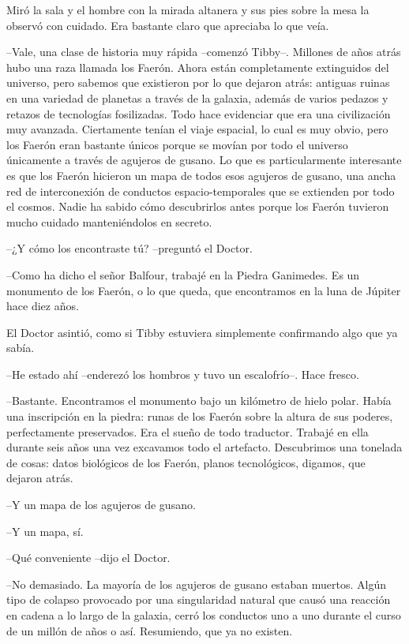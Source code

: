 {Miró la sala y el hombre con la mirada altanera y sus pies sobre la mesa
la observó con cuidado. Era bastante claro que apreciaba lo que veía.}

{--Vale, una clase de historia muy rápida --comenzó Tibby--. Millones de
 años atrás hubo una raza llamada los Faerón. Ahora están completamente
 extinguidos del universo, pero sabemos que existieron por lo que dejaron
 atrás: antiguas ruinas en una variedad de planetas a través de la
 galaxia, además de varios pedazos y retazos de tecnologías fosilizadas.
 Todo hace evidenciar que era una civilización muy avanzada. Ciertamente
 tenían el viaje espacial, lo cual es muy obvio, pero los Faerón eran
 bastante únicos porque se movían por todo el universo únicamente a
 través de agujeros de gusano. Lo que es particularmente interesante es
 que los Faerón hicieron un mapa de todos esos agujeros de gusano, una
 ancha red de interconexión de conductos espacio-temporales que se
 extienden por todo el cosmos. Nadie ha sabido cómo descubrirlos antes
porque los Faerón tuvieron mucho cuidado manteniéndolos en secreto.}

{--¿Y cómo los encontraste tú? --preguntó el Doctor.}

{--Como ha dicho el señor Balfour, trabajé en la Piedra Ganimedes. Es un
 monumento de los Faerón, o lo que queda, que encontramos en la luna de
Júpiter hace diez años.}

{El Doctor asintió, como si Tibby estuviera simplemente confirmando algo
que ya sabía.}

{--He estado ahí --enderezó los hombros y tuvo un escalofrío--. Hace
fresco.}

{--Bastante. Encontramos el monumento bajo un kilómetro de hielo polar.
 Había una inscripción en la piedra: runas de los Faerón sobre la altura
 de sus poderes, perfectamente preservados. Era el sueño de todo
 traductor. Trabajé en ella durante seis años una vez excavamos todo el
 artefacto. Descubrimos una tonelada de cosas: datos biológicos de los
Faerón, planos tecnológicos, digamos, que dejaron atrás.}

{--Y un mapa de los agujeros de gusano.}

{--Y un mapa, sí.}

{--Qué conveniente --dijo el Doctor.}

{--No demasiado. La mayoría de los agujeros de gusano estaban muertos.
 Algún tipo de colapso provocado por una singularidad natural que causó
 una reacción en cadena a lo largo de la galaxia, cerró los conductos uno
 a uno durante el curso de un millón de años o así. Resumiendo, que ya no
existen.}

